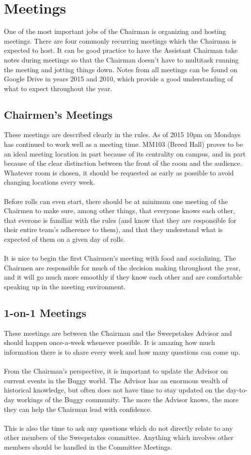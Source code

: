 \section{Meetings}
\label{sec:Meetings}
One of the most important jobs of the Chairman is organizing and hosting
meetings. There are four commonly recurring meetings which the Chairman
is expected to host. It can be good practice to have the Assistant Chairman
take notes during meetings so that the Chairman doesn't have to multitask
running the meeting and jotting things down. Notes from all meetings can
be found on Google Drive in years 2015 and 2010, which provide a good
understanding of what to expect throughout the year.

\subsection{Chairmen's Meetings}
These meetings are described clearly in the rules. As of 2015 10pm on
Mondays has continued to work well as a meeting time. MM103
(Breed Hall) proves to be an ideal meeting location in part because of its
centrality on campus, and in part because of the clear distinction between
the front of the room and the audience. Whatever room is chosen,
it should be requested as early as possible to avoid changing locations
every week.
\\\\
Before rolls can even start, there should be at minimum one meeting of the
Chairmen to make sure, among other things, that everyone knows each other, that
everone is familiar with the rules (and know that they are responsible for
their entire team's adherence to them), and that they understand what is
expected of them on a given day of rolls.
\\\\
It is nice to begin the first Chairmen's meeting with food and socializing.
The Chairmen are responsible for much of the decision making
throughout the year, and it will go much more smoothly if they know each
other and are comfortable speaking up in the meeting environment.

\subsection{1-on-1 Meetings}
These meetings are between the Chairman and the Sweepstakes Advisor and should
happen once-a-week whenever possible. It is amazing how much information
there is to share every week and how many questions can come up.
\\\\
From the Chairman's perspective, it is important to update the Advisor on
current events in the Buggy world. The Advisor has an enormous wealth of
historical knowledge, but often does not have time to stay updated on the
day-to-day workings of the Buggy community. The more the Advisor knows,
the more they can help the Chairman lead with confidence.
\\\\
This is also the time to ask any questions which do not directly relate to
any other members of the Sweepstakes committee. Anything which involves other
members should be handled in the Committee Meetings.

